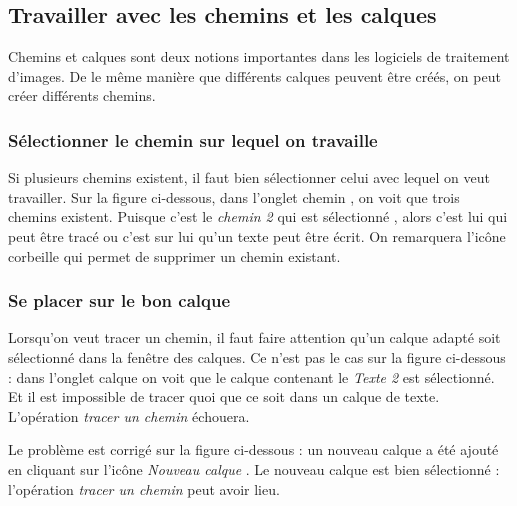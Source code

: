 \subsection{Travailler avec les chemins et les calques}\label{Gimp3travaillerChemin}

Chemins et calques sont deux notions importantes dans les logiciels de traitement d'images. De le même manière que différents calques peuvent être créés, on peut créer différents chemins.

\subsubsection{Sélectionner le chemin sur lequel on travaille}

Si plusieurs chemins existent, il faut bien sélectionner celui avec lequel on veut travailler. Sur la figure ci-dessous, dans l'onglet chemin , on voit que trois chemins existent. Puisque c'est le \emph{chemin 2} qui est sélectionné , alors c'est lui qui peut être tracé ou c'est sur lui qu'un texte peut être écrit. On remarquera l'icône corbeille  qui permet de supprimer un chemin existant.  



\subsubsection{Se placer sur le bon calque}

Lorsqu'on veut tracer un chemin, il faut faire attention qu'un calque adapté soit sélectionné dans la fenêtre des calques. Ce n'est pas le cas sur la figure ci-dessous : dans l'onglet calque  on voit que le calque contenant le \emph{Texte 2}  est sélectionné. Et il est impossible de tracer quoi que ce soit dans un calque de texte. L'opération \emph{tracer un chemin} échouera. 


Le problème est corrigé sur la figure ci-dessous : un nouveau calque a été ajouté en cliquant sur l'icône \emph{Nouveau calque} . Le nouveau calque est bien sélectionné  : l'opération \emph{tracer un chemin} peut avoir lieu.  


